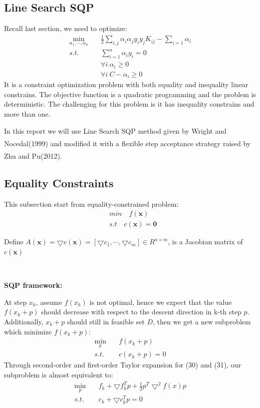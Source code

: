 \documentclass{article}
\newcommand{\upcite}[1]{\textsuperscript{\textsuperscript{\cite{#1}}}}
\begin{document}
\begin{spacing}{1.5}
\section{Line Search SQP}
Recall last section, we need to optimize:
\begin{align}
\min_{\alpha_1,\cdots,\alpha_n}&\quad \frac{1}{2}\sum_{i,j}\alpha_i\alpha_jy_iy_jK_{ij}-\sum_{i=1}\alpha_i\\
s.t. &\quad \sum^n_{i=1}\alpha_iy_i=0\\
&\quad \forall i\ \alpha_i\ge0\\
&\quad \forall i\ C-\alpha_i\ge0
\end{align}
It is a constraint optimization problem with both equality and inequality linear constrains. The objective function is a quadratic programming and the problem is deterministic. The challenging for this problem is it has inequality constrains and more than one. \par

In this report we will use Line Search SQP method given by Wright and Nocedal(1999)\upcite{Ref7} and modified it with a flexible step acceptance strategy raised by Zhu and Pu(2012)\upcite{Ref8}.

\subsection{Equality Constraints}
This subsection start from equality-constrained problem:
\begin{align}
&min\quad f(\bm{x})\\
&s.t\quad c(\bm{x})=\bm{0}
\end{align}

Define $A(\bm{x})=\bigtriangledown c(\bm{x})=[\bigtriangledown c_1, \cdots, \bigtriangledown c_m]\in R^{n\times m}$, is a Jacobian matrix of $c(\bm{x})$\par
~\par
\textbf{SQP framework:}\par
At step $x_k$, assume $f(x_k)$ is not optimal, hence we expect that the value $f(x_k+p)$ should decrease with respect to the descent direction in k-th step $p$. Additionally, $x_k+p$ should still in feasible set $D$, then we get a new subproblem which minimize $f(x_k+p)$:
\begin{align}
\min_p&\quad f(x_k+p)\\
s.t. &\quad c(x_k+p)=0
\end{align}
Through second-order and first-order Taylor expansion for (30) and (31), our subproblem is almost equivalent to:
\begin{align}
\min_p&\quad f_k+\bigtriangledown f_k^Tp+\frac{1}{2}p^T\bigtriangledown^2f(x)p\\
s.t. &\quad c_k+\bigtriangledown c_k^Tp=0
\end{align}


\end{spacing}
\end{document}
